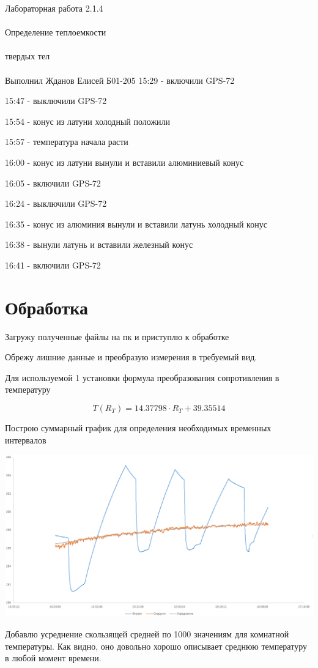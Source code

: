 \documentclass{astroedu-lab}
\begin{document}
\begin{problem}{\huge Лабораторная работа 2.1.4\\\\Определение теплоемкости\\\\твердых тел\\\\Выполнил Жданов Елисей Б01-205}
	15:29 - включили GPS-72

	15:47 - выключили GPS-72

	15:54 - конус из латуни холодный положили

	15:57 - температура начала расти

	16:00 - конус из латуни вынули и вставили алюминиевый конус

	16:05 - включили GPS-72

	16:24 - выключили GPS-72

	16:35 - конус из алюминия вынули и вставили латунь холодный конус

	16:38 - вынули латунь и вставили железный конус

	16:41 - включили GPS-72

\section{Обработка}

Загружу полученные файлы на пк и приступлю к обработке

Обрежу лишние данные и преобразую измерения в требуемый вид.

Для используемой 1 установки формула преобразования сопротивления в температуру

\begin{equation}
	T(R_T)= 14.37798 \cdot R_T + 39.35514
\end{equation}

Построю суммарный график для определения необходимых временных интервалов

\begin{center}
\includegraphics[width=1\textwidth]{total.png}
\label{ris:image}
\end{center}

Добавлю усреднение скользящей средней по 1000 значениям для комнатной температуры. Как видно, оно довольно хорошо описывает среднюю температуру в любой момент времени.


\end{problem}
\end{document}
